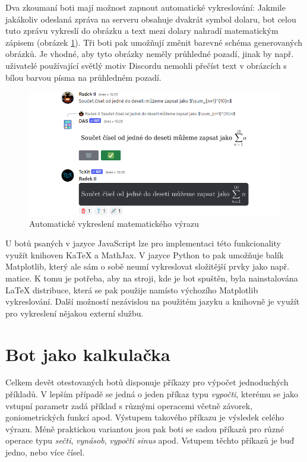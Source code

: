 \documentclass[FM]{tulthesis}
\begin{document}
	Dva zkoumaní boti mají možnost zapnout automatické vykreslování: Jakmile jakákoliv odeslaná zpráva na serveru obsahuje dvakrát symbol dolaru, bot celou tuto zprávu vykreslí do obrázku a text mezi dolary nahradí matematickým zápisem (obrázek \ref{_tag_img_autotex}). Tři boti pak umožňují změnit barevné schéma generovaných obrázků. Je vhodné, aby tyto obrázky neměly průhledné pozadí, jinak by např. uživatelé používající světlý motiv Discordu nemohli přečíst text v obrázcích s bílou barvou písma na průhledném pozadí.
	
	\begin{figure}[ht]
		\centering
		\includegraphics[width=\textwidth]{img/AutoTeX}
		\caption{Automatické vykreslení matematického výrazu}
		\label{_tag_img_autotex}
	\end{figure}
	
	U botů psaných v jazyce JavaScript lze pro implementaci této funkcionality využít knihoven KaTeX a MathJax. V jazyce Python to pak umožňuje balík Matplotlib, který ale sám o sobě neumí vykreslovat složitější prvky jako např. matice. K tomu je potřeba, aby na stroji, kde je bot spuštěn, byla nainstalována LaTeX distribuce, která se pak použije namísto výchozího Matplotlib vykreslování. Další možností nezávislou na použitém jazyku a knihovně je využít pro vykreslení nějakou externí službu.
	
	\section{Bot jako kalkulačka}
	
	Celkem devět otestovaných botů disponuje příkazy pro výpočet jednoduchých příkladů. V lepším případě se jedná o jeden příkaz typu \textit{vypočti}, kterému se jako vstupní parametr zadá příklad s různými operacemi včetně závorek, goniometrických funkcí apod. Výstupem takového příkazu je výsledek celého výrazu. Méně praktickou variantou jsou pak boti se sadou příkazů pro různé operace typu \textit{sečti}, \textit{vynásob}, \textit{vypočti sinus} apod. Vstupem těchto příkazů je buď jedno, nebo více čísel.
	
\end{document}
